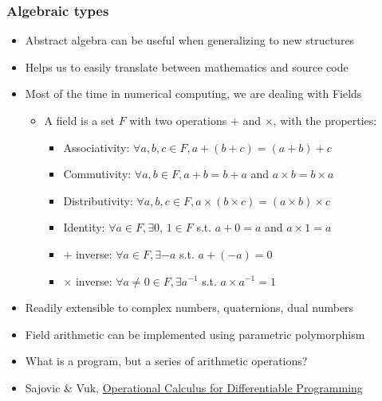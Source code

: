 \documentclass{beamer}
\begin{document}
    \begin{frame}
        \frametitle{Algebraic types}
        \begin{itemize}
            \item Abstract algebra can be useful when generalizing to new structures
            \item Helps us to easily translate between mathematics and source code
            \item Most of the time in numerical computing, we are dealing with Fields
            \begin{itemize}
                \item A field is a set $F$ with two operations $+$ and $\times$, with the properties:
                \begin{itemize}
                    \item Associativity: $\forall a, b, c \in F, a + (b + c) = (a + b) + c$
                    \item Commutivity: $\forall a, b \in F, a + b = b + a$ and $a\times b = b\times a$
                    \item Distributivity: $\forall a, b, c \in F, a \times (b \times c) = (a \times b) \times c$
                    \item Identity: $\forall a \in F, \exists 0$, $ 1 \in F$ s.t. $a + 0 = a$ and $a\times 1= a$
                    \item $+$ inverse: $\forall a\in F, \exists -a$ s.t. $a + (-a) = 0$
                    \item $\times$ inverse: $\forall a\neq 0 \in F, \exists a^{-1}$ s.t. $a \times a^{-1} = 1$
                \end{itemize}
            \end{itemize}
            \item Readily extensible to complex numbers, quaternions, dual numbers
            \item Field arithmetic can be implemented using parametric polymorphism
            \item What is a program, but a series of arithmetic operations?
            \item Sajovic \& Vuk, \href{https://arxiv.org/pdf/1610.07690.pdf}{Operational Calculus for Differentiable Programming}
        \end{itemize}
    \end{frame}
\end{document}
